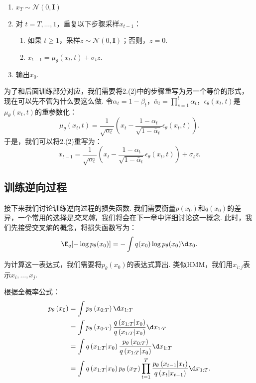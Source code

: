 \begin{enumerate}
    \item $x_T \sim \mathcal{N}(0, \mathbf{I})$
    \item 对 $t = T, \ldots, 1$，重复以下步骤采样$x_{t-1}$：
    \begin{enumerate}
        \item 如果 $t\geq 1$，采样$z \sim \mathcal{N}(0, \mathbf{I})$；否则，$z = 0$.
        \item $x_{t-1} = \mu_\theta(x_t,t) + \sigma_t z$.
    \end{enumerate}
    \item 输出$x_0$.
\end{enumerate}

为了和后面训练部分对应，我们需要将2.(2)中的步骤重写为另一个等价的形式，现在可以先不管为什么要这么做. 令$\alpha_t=1-\beta_t$，$\bar\alpha_t=\prod_{s=1}^t\alpha_t$，$\epsilon_\theta(x_t, t)$是$\mu_\theta(x_t,t)$的重参数化：
\[
\mu_{\theta}(x_t, t) =  \frac{1}{\sqrt{\alpha_t}} \left( x_t - \frac{1-\alpha_t}{\sqrt{1 - \bar{\alpha}_t}}\epsilon_{\theta}(x_t, t) \right).
\]
于是，我们可以将2.(2)重写为：
\[x_{t-1} = \frac{1}{\sqrt{\alpha_t}} \left( x_t - \frac{1-\alpha_t}{\sqrt{1-\bar\alpha_t}} \epsilon_\theta(x_t, t) \right) + \sigma_t z.\]


\subsection{训练逆向过程}

接下来我们讨论训练逆向过程的损失函数. 我们需要衡量$p(x_0)$和$q(x_0)$的差异，一个常用的选择是\emph{交叉熵}，我们将会在下一章中详细讨论这一概念. 此时，我们先接受交叉熵的概念，将损失函数写为：
\[
\E_q[-\log p_\theta(x_0)]=-\int q(x_0)\log p_\theta(x_0)\d x_0.
\]

为计算这一表达式，我们需要将$p_\theta(x_0)$的表达式算出. 类似HMM，我们用$x_{i:j}$表示$x_i,\dots,x_j$. 

根据全概率公式：
\[
    \begin{aligned}
        p_\theta\left(x_{0}\right)&=\int  p_\theta\left(x_{0:T}\right) \d  x_{1:T}\\
            &= \int p_\theta\left(x_{0:T}\right) \frac{q\left(x_{1:T} | x_{0}\right)}{q\left(x_{1:T} | x_{0}\right)} \d  x_{1:T} \\
        &= \int q\left(x_{1:T} | x_{0}\right) \frac{p_\theta\left(x_{0:T}\right)}{q\left(x_{1:T} | x_{0}\right)} \d  x_{1:T} \\
        &= \int q\left(x_{1:T} | x_{0}\right) p_\theta\left(x_{T}\right) \prod_{t=1}^T \frac{p_\theta\left(x_{t-1} | x_{t}\right)}{q\left(x_{t} | x_{t-1}\right)}\d  x_{1:T}.
    \end{aligned}    
\]


